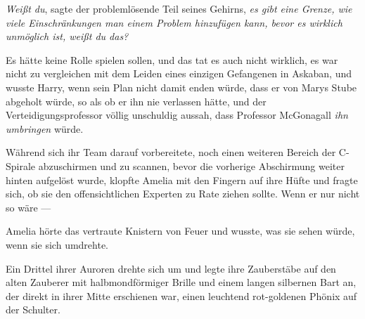 \emph{Weißt du}, sagte der problemlösende Teil seines Gehirns, \emph{es gibt eine Grenze, wie viele Einschränkungen man einem Problem hinzufügen kann, bevor es wirklich unmöglich ist, weißt du das?}

Es hätte keine Rolle spielen sollen, und das tat es auch nicht wirklich, es war nicht zu vergleichen mit dem Leiden eines einzigen Gefangenen in Askaban, und wusste Harry, wenn sein Plan nicht damit enden würde, dass er von Marys Stube abgeholt würde, so als ob er ihn nie verlassen hätte, und der Verteidigungsprofessor völlig unschuldig aussah, dass Professor McGonagall \emph{ihn umbringen} würde.

\later

Während sich ihr Team darauf vorbereitete, noch einen weiteren Bereich der C-Spirale abzuschirmen und zu scannen, bevor die vorherige Abschirmung weiter hinten aufgelöst wurde, klopfte Amelia mit den Fingern auf ihre Hüfte und fragte sich, ob sie den offensichtlichen Experten zu Rate ziehen sollte. Wenn er nur nicht so wäre —

Amelia hörte das vertraute Knistern von Feuer und wusste, was sie sehen würde, wenn sie sich umdrehte.

Ein Drittel ihrer Auroren drehte sich um und legte ihre Zauberstäbe auf den alten Zauberer mit halbmondförmiger Brille und einem langen silbernen Bart an, der direkt in ihrer Mitte erschienen war, einen leuchtend rot-goldenen Phönix auf der Schulter.

